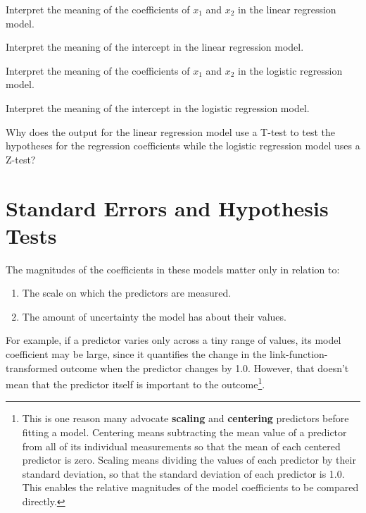 \begin{question}{}
Interpret the meaning of the coefficients of $x_1$ and $x_2$ in the linear regression model.
\end{question}

\begin{question}{}
Interpret the meaning of the intercept in the linear regression model.
\end{question}

\begin{question}{}
Interpret the meaning of the coefficients of $x_1$ and $x_2$ in the logistic regression model.
\end{question}

\begin{question}{}
Interpret the meaning of the intercept in the logistic regression model.
\end{question}

\begin{question}{}
Why does the output for the linear regression model use a T-test to test the hypotheses for the regression coefficients while the logistic regression model uses a Z-test?
\end{question}


\section{Standard Errors and Hypothesis Tests \label{section:sehyp}}

The magnitudes of the coefficients in these models matter only in relation to:
\begin{enumerate}
\item The scale on which the predictors are measured. 
\item The amount of uncertainty the model has about their values.
\end{enumerate}
For example, if a predictor varies only across a tiny range of values, its model coefficient may be large, since it quantifies the change in the link-function-transformed outcome when the predictor changes by 1.0. However, that doesn't mean that the predictor itself is important to the outcome\footnote{This is one reason many advocate \textbf{scaling} and \textbf{centering} predictors before fitting a model. Centering means subtracting the mean value of a predictor from all of its individual measurements so that the mean of each centered predictor is zero. Scaling means dividing the values of each predictor by their standard deviation, so that the standard deviation of each predictor is 1.0. This enables the relative magnitudes of the model coefficients to be compared directly.}.

